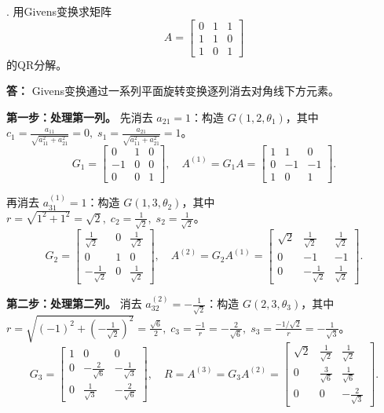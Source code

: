 \documentclass{article}
\begin{document}
. 用Givens变换求矩阵
\[
A=\begin{bmatrix}
0 & 1 & 1 \\
1 & 1 & 0 \\
1 & 0 & 1
\end{bmatrix}
\]
的QR分解。

\noindent \textbf{答：}
Givens变换通过一系列平面旋转变换逐列消去对角线下方元素。

\textbf{第一步：处理第一列。}
先消去 $a_{21}=1$：构造 $G(1,2,\theta_1)$，其中
$c_1=\frac{a_{11}}{\sqrt{a_{11}^2+a_{21}^2}}=0,\; s_1=\frac{a_{21}}{\sqrt{a_{11}^2+a_{21}^2}}=1$。
\[
G_1=\begin{bmatrix}
0 & 1 & 0\\-1 & 0 & 0\\0 & 0 & 1
\end{bmatrix},\quad
A^{(1)}=G_1A=\begin{bmatrix}
1 & 1 & 0\\0 & -1 & -1\\1 & 0 & 1
\end{bmatrix}.
\]

再消去 $a_{31}^{(1)}=1$：构造 $G(1,3,\theta_2)$，其中
$r=\sqrt{1^2+1^2}=\sqrt{2},\;c_2=\frac{1}{\sqrt{2}},\;s_2=\frac{1}{\sqrt{2}}$。
\[
G_2=\begin{bmatrix}
\frac{1}{\sqrt{2}} & 0 & \frac{1}{\sqrt{2}}\\[4pt]
0 & 1 & 0\\[4pt]
-\frac{1}{\sqrt{2}} & 0 & \frac{1}{\sqrt{2}}
\end{bmatrix},\quad
A^{(2)}=G_2A^{(1)}=\begin{bmatrix}
\sqrt{2} & \frac{1}{\sqrt{2}} & \frac{1}{\sqrt{2}}\\[4pt]
0 & -1 & -1\\[4pt]
0 & -\frac{1}{\sqrt{2}} & \frac{1}{\sqrt{2}}
\end{bmatrix}.
\]

\textbf{第二步：处理第二列。}
消去 $a_{32}^{(2)}=-\frac{1}{\sqrt{2}}$：构造 $G(2,3,\theta_3)$，其中
$r=\sqrt{(-1)^2+(-\frac{1}{\sqrt{2}})^2}=\frac{\sqrt{6}}{2},\;
c_3=\frac{-1}{r}=-\frac{2}{\sqrt{6}},\;s_3=\frac{-1/\sqrt{2}}{r}=-\frac{1}{\sqrt{3}}$。
\[
G_3=\begin{bmatrix}
1 & 0 & 0\\[4pt]
0 & -\frac{2}{\sqrt{6}} & -\frac{1}{\sqrt{3}}\\[4pt]
0 & \frac{1}{\sqrt{3}} & -\frac{2}{\sqrt{6}}
\end{bmatrix},\quad
R=A^{(3)}=G_3A^{(2)}=\begin{bmatrix}
\sqrt{2} & \frac{1}{\sqrt{2}} & \frac{1}{\sqrt{2}}\\[4pt]
0 & \frac{3}{\sqrt{6}} & \frac{1}{\sqrt{6}}\\[4pt]
0 & 0 & -\frac{2}{\sqrt{3}}
\end{bmatrix}.
\]
\end{document}
